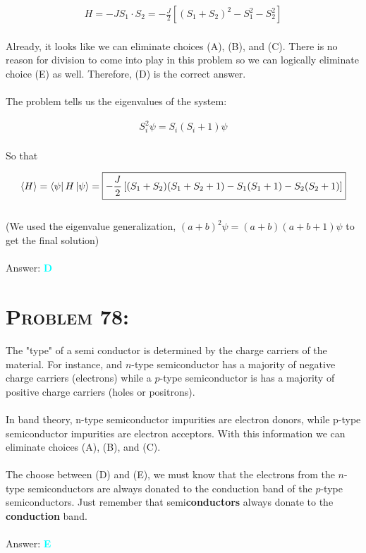 \documentclass{article}
\begin{document}
\begin{gather}
H = - J S_{1} \cdot S_{2} = -\frac{J}{2} \left[   (S_{1} + S_{2})^{2} - S_{1}^{2} - S_{2}^{2}  \right]\nonumber
\end{gather}
\\
Already, it looks like we can eliminate choices (A), (B), and (C). There is no reason for division to come into play in this problem so we can logically eliminate choice (E) as well. Therefore, (D) is the correct answer.\\
\\
The problem tells us the eigenvalues of the system:

\begin{gather}
S_{i}^{2} \psi = S_{i}(S_{i} + 1) \psi \nonumber
\end{gather}
\\
So that 

\begin{gather}
\braket{H} = \bra{\psi} H \ket{\psi} =  \boxed{-\frac{J}{2} \left[   (S_{1} + S_{2}) (S_{1} + S_{2} + 1)  - S_{1}(S_{1} + 1) - S_{2}(S_{2} + 1) \right]}\nonumber
\end{gather}
\\
(We used the eigenvalue generalization, $(a + b)^{2} \psi  = (a + b) (a + b + 1) \psi$ to get the final solution)
\\\\
Answer: \textbf{\textcolor{cyan}D}\\


\section{\textsc{Problem 78:}} The "type" of a semi conductor is determined by the charge carriers of the material. For instance, and $n$-type semiconductor has a majority of negative charge carriers (electrons) while a $p$-type semiconductor is has a majority of positive charge carriers (holes or positrons). \\
\\
In band theory, n-type semiconductor impurities are electron donors, while p-type semiconductor impurities are electron acceptors. With this information we can eliminate choices (A), (B), and (C).\\
\\
The choose between (D) and (E), we must know that the electrons from the $n$-type semiconductors are always donated to the conduction band of the $p$-type semiconductors. Just remember that semi\textbf{conductors} always donate to the \textbf{conduction} band. 
\\\\
Answer: \textbf{\textcolor{cyan}E}\\
\end{document}
